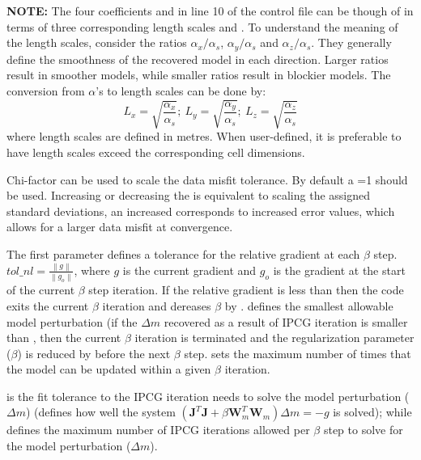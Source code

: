 \begin{description}[leftmargin=5cm, style=sameline, align=left]
\textbf{NOTE:} The four coefficients  and  in line 10 of the control file can be though of in terms of three corresponding length scales  and . To understand the meaning of the length scales, consider the ratios $\alpha_x/\alpha_s$, $\alpha_y/\alpha_s$ and $\alpha_z/\alpha_s$. They generally define the smoothness of the recovered model in each direction. Larger ratios result in smoother models, while smaller ratios result in blockier models. The conversion from $\alpha$'s to length scales can be done by:
\begin{equation}
\label{eq:lengthscale}
L_x = \sqrt{\frac{\alpha_x}{\alpha_s}} ; ~L_y = \sqrt{\frac{\alpha_y}{\alpha_s}} ; ~L_z = \sqrt{\frac{\alpha_z}{\alpha_s}}
\end{equation}
where length scales are defined in metres. When user-defined, it is preferable to have length scales exceed the corresponding cell dimensions.
\item[\codeName{chifact}] Chi-factor can be used to scale the data misfit tolerance. By default a =1 should be used. Increasing or decreasing the  is equivalent to scaling the assigned standard deviations, an increased  corresponds to increased error values, which allows for a larger data misfit at convergence. 
\item[\codeName{tol\_nl, mindm, iter\_per\_beta}] The first parameter  defines a tolerance for the relative gradient at each $\beta$ step. $tol\_nl=\frac{\left\|g\right\|}{\left\|g_{o}\right\|}$, where $g$ is the current gradient and $g_o$ is the gradient at the start of the current $\beta$ step iteration. If the relative gradient is less than  then the code exits the current $\beta$ iteration and dereases $\beta$ by .  defines the smallest allowable model perturbation (if the $\Delta m$ recovered as a result of IPCG iteration is smaller than , then the current $\beta$ iteration is terminated and the regularization parameter ($\beta$) is reduced by  before the next $\beta$ step.  sets the maximum number of times that the model can be updated within a given $\beta$ iteration.
\item[\codeName{tol\_ipcg, max\_iter\_ipcg}]  is the fit tolerance to the IPCG iteration needs to solve the model perturbation ($\Delta m$) (defines how well the system $(\mathbf{J}^T\mathbf{J}+\beta\mathbf{W}_m^T\mathbf{W}_m)\Delta m=-g$ is solved); while  defines the maximum number of IPCG iterations allowed per $\beta$ step to solve for the model perturbation ($\Delta m$).

\end{description}
